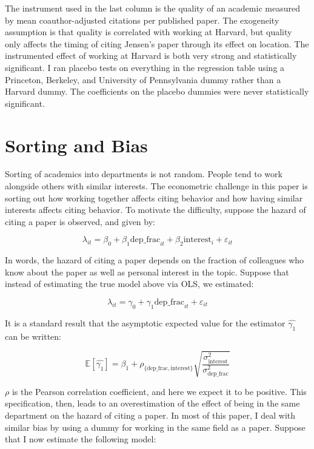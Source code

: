 \documentclass[]{article}
\begin{document}
The instrument used in the last column is the quality of an academic measured by
mean coauthor-adjusted citations per published paper. The exogeneity
assumption is that quality is correlated with working at Harvard, but
quality only affects the timing of citing Jensen's paper through its
effect on location. The instrumented effect of working at Harvard is
both very strong and statistically significant. I ran placebo tests on
everything in the regression table using a Princeton, Berkeley, and
University of Pennsylvania dummy rather than a Harvard dummy. The
coefficients on the placebo dummies were never statistically
significant.

\section{Sorting and Bias}
\label{sec:sortbias}

Sorting of academics into departments is not random. People tend to work
alongside others with similar interests. The econometric challenge in
this paper is sorting out how working together affects citing behavior
and how having similar interests affects citing behavior. To motivate
the difficulty, suppose the hazard of citing a paper is observed, and
given by:

\begin{equation}
\lambda_{it} = \beta_0 + \beta_1 \mbox{dep\_frac}_{it} + \beta_2 \mbox{interest}_i + \varepsilon_{it}
\end{equation}

In words, the hazard of citing a paper depends on the fraction of
colleagues who know about the paper as well as personal interest in the
topic. Suppose that instead of estimating the true model above via OLS,
we estimated:

\begin{equation}
\lambda_{it} = \gamma_0 + \gamma_1 \mbox{dep\_frac}_{it} + \varepsilon_{it}
\end{equation}

It is a standard result that the asymptotic expected value for the
estimator $\hat{\gamma_1}$ can be written:

\begin{equation}
    \mathbb{E}[\hat{\gamma_1}] = \beta_1 + \rho_{\{\mbox{dep\_frac},\mbox{interest}\}} \sqrt{\frac{\sigma_{\mbox{interest}}^2}{\sigma_{\mbox{dep\_frac}}^2}}
\end{equation}

$\rho$ is the Pearson correlation coefficient, and here we expect it to
be positive. This specification, then, leads to an overestimation of the
effect of being in the same department on the hazard of citing a paper.
In most of this paper, I deal with similar bias by using a dummy for
working in the same field as a paper. Suppose that I now estimate the
following model:
\end{document}
